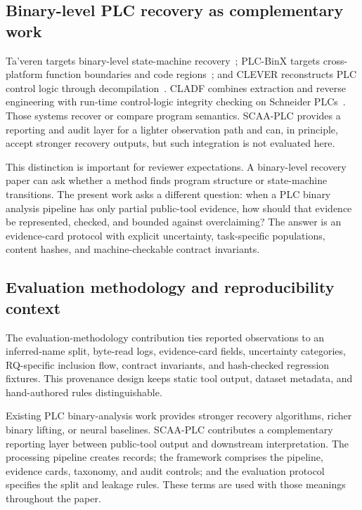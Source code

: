 \documentclass[manuscript,screen,review]{acmart}
\begin{document}
\subsection{Binary-level PLC recovery as complementary work}

Ta'veren targets binary-level state-machine recovery~\cite{taveren_ndss2026}; PLC-BinX targets cross-platform function boundaries and code regions~\cite{plcbinx_arxiv2026}; and CLEVER reconstructs PLC control logic through decompilation~\cite{clever_tifs2024}. CLADF combines extraction and reverse engineering with run-time control-logic integrity checking on Schneider PLCs~\cite{cladf_jiot2024}. Those systems recover or compare program semantics. SCAA-PLC provides a reporting and audit layer for a lighter observation path and can, in principle, accept stronger recovery outputs, but such integration is not evaluated here.

This distinction is important for reviewer expectations. A binary-level recovery paper can ask whether a method finds program structure or state-machine transitions. The present work asks a different question: when a PLC binary analysis pipeline has only partial public-tool evidence, how should that evidence be represented, checked, and bounded against overclaiming? The answer is an evidence-card protocol with explicit uncertainty, task-specific populations, content hashes, and machine-checkable contract invariants.

\subsection{Evaluation methodology and reproducibility context}

The evaluation-methodology contribution ties reported observations to an inferred-name split, byte-read logs, evidence-card fields, uncertainty categories, RQ-specific inclusion flow, contract invariants, and hash-checked regression fixtures. This provenance design keeps static tool output, dataset metadata, and hand-authored rules distinguishable.

Existing PLC binary-analysis work provides stronger recovery algorithms, richer binary lifting, or neural baselines. SCAA-PLC contributes a complementary reporting layer between public-tool output and downstream interpretation. The processing pipeline creates records; the framework comprises the pipeline, evidence cards, taxonomy, and audit controls; and the evaluation protocol specifies the split and leakage rules. These terms are used with those meanings throughout the paper.
\end{document}
